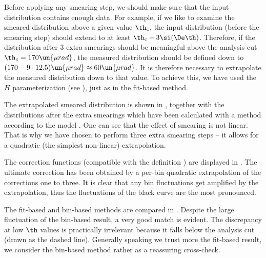 Before applying any smearing step, we should make sure that the input distribution contains enough data. For example, if we like to examine the smeared distribution above a given value $\th_{\rm c}$, the input distribution (before the smearing step) should extend to at least $\th_{\rm c} -3\si(\De\th)$. Therefore, if the distribution after 3 extra smearings should be meaningful above the analysis cut $\th_c = 170\un{\mu rad}$, the measured distribution should be defined down to $(170 - 9\cdot 12.5) \un{\mu rad}\approx 60 \un{\mu rad}$. It is therefore necessary to extrapolate the measured distribution down to that value. To achieve this, we have used the $H$ parameterization (see ), just as in the fit-based method.

The extrapolated smeared distribution is shown in , together with the distributions after the extra smearings which have been calculated with a  method according to the model . One can see that the effect of smearing is not linear. That is why we have chosen to perform three extra smearing steps -- it allows for a quadratic (the simplest non-linear) extrapolation.

The correction functions (compatible with the definition ) are displayed in . The ultimate correction has been obtained by a per-bin quadratic extrapolation of the corrections one to three. It is clear that any bin fluctuations get amplified by the extrapolation, thus the fluctuations of the black curve are the most pronounced.

\bmfig
{}
\emfig


The fit-based and bin-based methods are compared in . Despite the large fluctuation of the bin-based result, a very good match is evident. The discrepancy at low $\th$ values is practically irrelevant because it falls below the analysis cut (drawn as the dashed line). Generally speaking we trust more the fit-based result, we consider the bin-based method rather as a reassuring cross-check.

